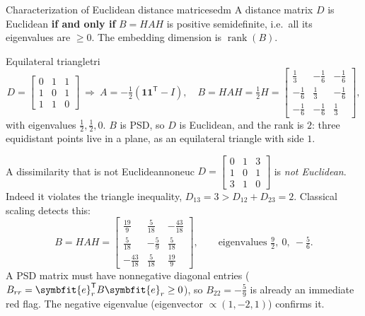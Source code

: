 \documentclass[11pt]{article}
\newcommand{\bm}[1]{\symbfit{#1}}
\newcommand{\one}{\symbf{1}}
\newcommand{\T}{^{\mathsf T}}
\newcommand{\rank}{\operatorname{rank}}
\begin{document}
\begin{theorem}{Characterization of Euclidean distance matrices}{edm}
A distance matrix $D$ is Euclidean \textbf{if and only if} $B=HAH$ is positive semidefinite,
i.e.\ all its eigenvalues are $\ge0$. The embedding dimension is $\rank(B)$.
\end{theorem}

\begin{example}{Equilateral triangle}{tri}
\[
D=\begin{bmatrix}0&1&1\\1&0&1\\1&1&0\end{bmatrix}\ \Rightarrow\
A=-\tfrac12(\one\one\T-I),\quad
B=HAH=\tfrac12H=\begin{bmatrix}\tfrac13&-\tfrac16&-\tfrac16\\-\tfrac16&\tfrac13&-\tfrac16\\-\tfrac16&-\tfrac16&\tfrac13\end{bmatrix},
\]
with eigenvalues $\tfrac12,\tfrac12,0$. $B$ is PSD, so $D$ is Euclidean, and the rank is $2$:
three equidistant points live in a plane, as an equilateral triangle with side $1$.
\end{example}

\begin{example}{A dissimilarity that is not Euclidean}{noneuc}
$D=\begin{bmatrix}0&1&3\\1&0&1\\3&1&0\end{bmatrix}$ is \emph{not Euclidean}. Indeed it violates the
triangle inequality, $D_{13}=3>D_{12}+D_{23}=2$. Classical scaling detects this:
\[
B=HAH=\begin{bmatrix}\tfrac{19}{9}&\tfrac{5}{18}&-\tfrac{43}{18}\\[2pt]\tfrac{5}{18}&-\tfrac59&\tfrac{5}{18}\\[2pt]-\tfrac{43}{18}&\tfrac{5}{18}&\tfrac{19}{9}\end{bmatrix},
\qquad\text{eigenvalues } \tfrac92,\ 0,\ -\tfrac56 .
\]
A PSD matrix must have nonnegative diagonal entries ($B_{rr}=\bm e_r\T B\bm e_r\ge0$), so
$B_{22}=-\tfrac59$ is already an immediate red flag. The negative eigenvalue (eigenvector
$\propto(1,-2,1)$) confirms it.
\end{example}
\end{document}
